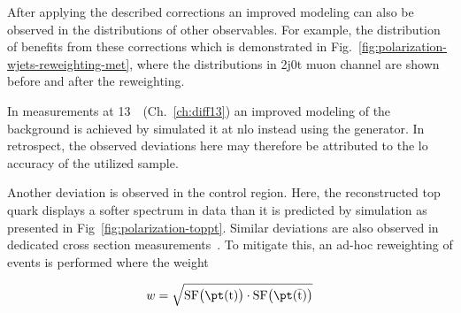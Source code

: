 
After applying the described \wjets corrections an improved modeling can also be observed in the distributions of other observables. For example, the distribution of \met benefits from these corrections which is demonstrated in Fig.~\ref{fig:polarization-wjets-reweighting-met}, where the \met distributions in 2j0t muon channel are shown before and after the reweighting. 


In measurements at 13~\TeV~(Ch.~\ref{ch:diff13}) an improved modeling of the \wjets background is achieved by simulated it at \gls{nlo} instead using the \MGAMC generator. In retrospect, the observed deviations here may therefore be attributed to the \gls{lo} accuracy of the utilized \MG \wjets sample.

Another deviation is observed in the \ttbar control region. Here, the reconstructed top quark \pt displays a softer spectrum in data than it is predicted by simulation as presented in Fig~\ref{fig:polarization-toppt}. Similar deviations are also observed in dedicated \ttbar cross section measurements~\cite{Chatrchyan:2012saa,Khachatryan:2015oqa}. To mitigate this, an ad-hoc reweighting of \ttbar events is performed where the weight

\begin{equation}
w=\sqrt{\mathrm{SF}\big(\pt(\mathrm{t})\big)\cdot\mathrm{SF}\big(\pt(\bar{\mathrm{t}})\big)}
\end{equation} 

